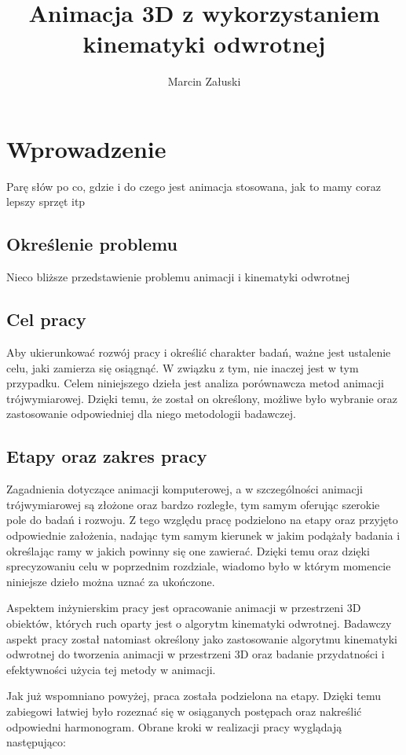 \documentclass[11pt]{mwrep}
\author{Marcin Załuski}
\title{Animacja 3D z wykorzystaniem kinematyki odwrotnej}
\begin{document}
\maketitle
\tableofcontents

\chapter{Wprowadzenie}
Parę słów po co, gdzie i do czego jest animacja stosowana, jak to mamy coraz lepszy sprzęt itp
  \section{Określenie problemu}
Nieco bliższe przedstawienie problemu animacji i kinematyki odwrotnej
  \section{Cel pracy}

Aby ukierunkować rozwój pracy i określić charakter badań, ważne jest ustalenie celu, jaki zamierza się osiągnąć. W związku z tym, nie inaczej jest w tym przypadku. Celem niniejszego dzieła jest analiza porównawcza metod animacji trójwymiarowej. Dzięki temu, że został on określony, możliwe było wybranie oraz zastosowanie odpowiedniej dla niego metodologii badawczej.

  \section{Etapy oraz zakres pracy}

Zagadnienia dotyczące animacji komputerowej, a w szczególności animacji trójwymiarowej są złożone oraz bardzo rozległe, tym samym oferując szerokie pole do badań i rozwoju. Z tego względu pracę podzielono na etapy oraz przyjęto odpowiednie założenia, nadając tym samym kierunek w jakim podążały badania i określając ramy w jakich powinny się one zawierać. Dzięki temu oraz dzięki sprecyzowaniu celu w poprzednim rozdziale, wiadomo było w którym momencie niniejsze dzieło można uznać za ukończone.

Aspektem inżynierskim pracy jest opracowanie animacji w przestrzeni 3D obiektów, których ruch oparty jest o algorytm kinematyki odwrotnej. Badawczy aspekt pracy został natomiast określony jako zastosowanie algorytmu kinematyki odwrotnej do tworzenia animacji w przestrzeni 3D oraz badanie przydatności i efektywności użycia tej metody w animacji.

Jak już wspomniano powyżej, praca została podzielona na etapy. Dzięki temu zabiegowi łatwiej było rozeznać się w osiąganych postępach oraz nakreślić odpowiedni harmonogram. Obrane kroki w realizacji pracy wyglądają następująco: 
\end{document}
